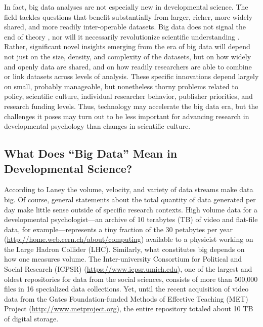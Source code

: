 \documentclass[letterpaper,man,apacite,natbib]{apa6}
\begin{document}
In fact, big data analyses are not especially new in developmental science.
The field tackles questions that benefit substantially from larger, richer, more widely shared, and more readily inter-operable datasets.
Big data does not signal the end of theory \cite{anderson_end_2008}, nor will it necessarily revolutionize scientific understanding \cite{boyd_critical_2012}. 
Rather, significant novel insights emerging from the era of big data will depend not just on the size, density, and complexity of the datasets, but on how widely and openly data are shared, and on how readily researchers are able to combine or link datasets across levels of analysis.
These specific innovations depend largely on small, probably manageable, but nonetheless thorny problems related to policy, scientific culture, individual researcher behavior, publisher priorities, and research funding levels.
Thus, technology may accelerate the big data era, but the challenges it poses may turn out to be less important for advancing research in developmental psychology than changes in scientific culture.

\subsection{What Does ``Big Data'' Mean in Developmental Science?}
According to Laney \citeyear{laney01controlling3v} the volume, velocity, and variety of data streams make data big.
Of course, general statements about the total quantity of data generated per day \cite{ibm_2015} make little sense outside of specific research contexts.
High volume data for a developmental psychologist---an archive of 10 terabytes (TB) of video and flat-file data, for example---represents a tiny fraction of the 30 petabytes per year (\url{http://home.web.cern.ch/about/computing}) available to a physicist working on the Large Hadron Collider (LHC).
Similarly, what constitutes big depends on how one measures volume.
The Inter-university Consortium for Political and Social Research (ICPSR) (\url{https://www.icpsr.umich.edu}), one of the largest and oldest repositories for data from the social sciences, consists of more than 500,000 files in 16 specialized data collections.
Yet, until the recent acquisition of video data from the Gates Foundation-funded Methods of Effective Teaching (MET) Project (\url{http://www.metproject.org}), the entire repository totaled about 10 TB of digital storage.
\end{document}
